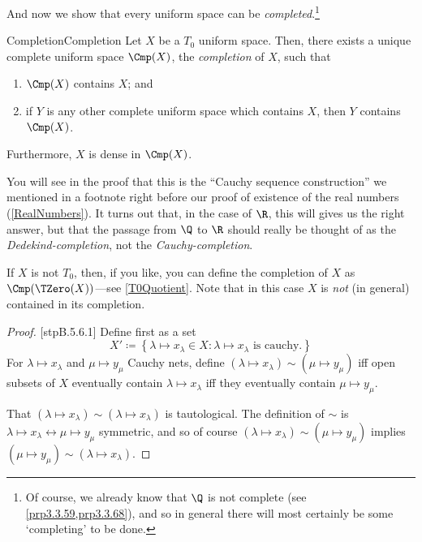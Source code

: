 And now we show that every uniform space can be \emph{completed}.\footnote{Of course, we already know that $\Q$ is not complete (see \cref{prp3.3.59,prp3.3.68}), and so in general there will most certainly be some `completing' to be done.}
\begin{thm}{Completion}{Completion}
Let $X$ be a $T_0$ uniform space.  Then, there exists a unique complete uniform space $\Cmp (X)$, the \emph{completion} of $X$, such that
\begin{enumerate}
\item $\Cmp (X)$ contains $X$; and
\item if $Y$ is any other complete uniform space which contains $X$, then $Y$ contains $\Cmp (X)$.
\end{enumerate}
Furthermore, $X$ is dense in $\Cmp (X)$.
\begin{rmk}
You will see in the proof that this is the ``Cauchy sequence construction'' we mentioned in a footnote right before our proof of existence of the real numbers (\cref{RealNumbers}).  It turns out that, in the case of $\R$, this will gives us the right answer, but that the passage from $\Q$ to $\R$ should really be thought of as the \emph{Dedekind-completion}, not the \emph{Cauchy-completion}.
\end{rmk}
\begin{rmk}
If $X$ is not $T_0$, then, if you like, you can define the completion of $X$ as $\Cmp (\TZero (X))$---see \cref{T0Quotient}.  Note that in this case $X$ is \emph{not} (in general) contained in its completion.
\end{rmk}
\begin{proof}
[stpB.5.6.1]
Define first as a set
\begin{equation}
X'\coloneqq \left\{ \lambda \mapsto x_\lambda \in X:\lambda \mapsto x_\lambda \text{ is cauchy.}\right\} 
\end{equation}
For $\lambda \mapsto x_\lambda$ and $\mu \mapsto y_\mu$ Cauchy nets, define $(\lambda \mapsto x_\lambda )\sim (\mu \mapsto y_\mu )$ iff open subsets of $X$ eventually contain $\lambda \mapsto x_\lambda$ iff they eventually contain $\mu \mapsto y_\mu$.

That $(\lambda \mapsto x_\lambda )\sim (\lambda \mapsto x_\lambda )$ is tautological.  The definition of $\sim$ is $\lambda \mapsto x_\lambda \leftrightarrow \mu \mapsto y_\mu$ symmetric, and so of course $(\lambda \mapsto x_\lambda )\sim (\mu \mapsto y_\mu )$ implies $(\mu \mapsto y_\mu )\sim (\lambda \mapsto x_\lambda )$.


\end{proof}
\end{thm}
